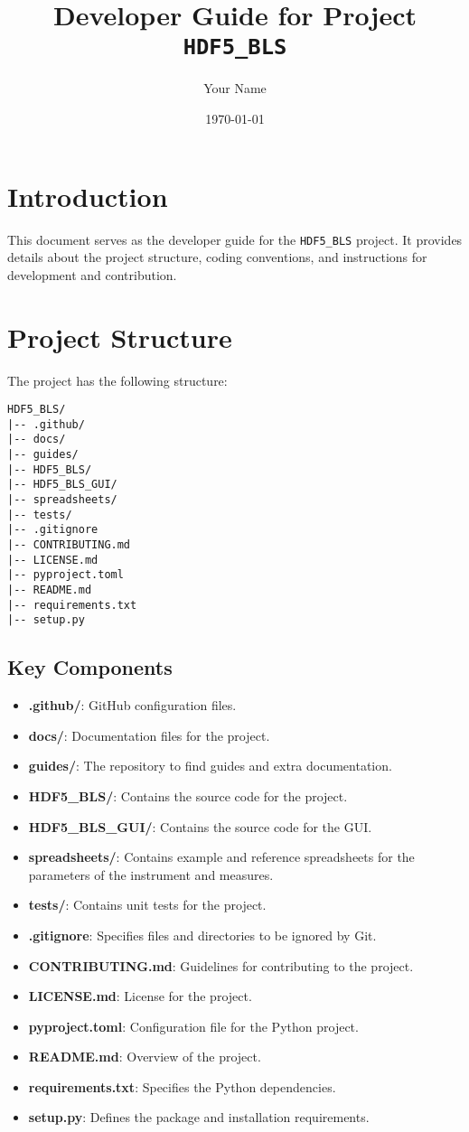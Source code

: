 \documentclass[a4paper,12pt]{article}
\title{Developer Guide for Project \texttt{HDF5\_BLS}}
\author{Your Name}
\date{\today}
\begin{document}
\maketitle

\tableofcontents

\section{Introduction}
This document serves as the developer guide for the \texttt{HDF5\_BLS} project. It provides details about the project structure, coding conventions, and instructions for development and contribution.

\section{Project Structure}
The project has the following structure:
\begin{verbatim}
HDF5_BLS/
|-- .github/
|-- docs/
|-- guides/
|-- HDF5_BLS/
|-- HDF5_BLS_GUI/
|-- spreadsheets/
|-- tests/
|-- .gitignore
|-- CONTRIBUTING.md
|-- LICENSE.md
|-- pyproject.toml
|-- README.md
|-- requirements.txt
|-- setup.py
\end{verbatim}

\subsection{Key Components}
\begin{itemize}
    \item \textbf{.github/}: GitHub configuration files.
    \item \textbf{docs/}: Documentation files for the project.
    \item \textbf{guides/}: The repository to find guides and extra documentation.
    \item \textbf{HDF5\_BLS/}: Contains the source code for the project.
    \item \textbf{HDF5\_BLS\_GUI/}: Contains the source code for the GUI.
    \item \textbf{spreadsheets/}: Contains example and reference spreadsheets for the parameters of the instrument and measures.
    \item \textbf{tests/}: Contains unit tests for the project.
    \item \textbf{.gitignore}: Specifies files and directories to be ignored by Git.
    \item \textbf{CONTRIBUTING.md}: Guidelines for contributing to the project.
    \item \textbf{LICENSE.md}: License for the project.
    \item \textbf{pyproject.toml}: Configuration file for the Python project.
    \item \textbf{README.md}: Overview of the project.
    \item \textbf{requirements.txt}: Specifies the Python dependencies.
    \item \textbf{setup.py}: Defines the package and installation requirements.
\end{itemize}
\end{document}
